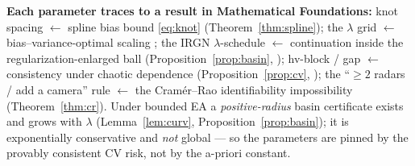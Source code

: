 \medskip
\noindent\textbf{Each parameter traces to a result in Mathematical
Foundations:} knot spacing $\leftarrow$ spline bias bound
\eqref{eq:knot} (Theorem~\ref{thm:spline}); the $\lambda$ grid
$\leftarrow$ bias--variance-optimal scaling \cite{wahba1990,craven1979};
the IRGN $\lambda$-schedule $\leftarrow$ continuation inside the
regularization-enlarged ball (Proposition~\ref{prop:basin},
\cite{bakushinskii1992}); hv-block / gap $\leftarrow$ consistency under
chaotic dependence (Proposition~\ref{prop:cv}, \cite{racine2000}); the
``$\ge 2$ radars / add a camera'' rule $\leftarrow$ the Cramér--Rao
identifiability impossibility (Theorem~\ref{thm:cr}). Under bounded EA a \emph{positive-radius} basin
certificate exists and grows with $\lambda$ (Lemma~\ref{lem:curv},
Proposition~\ref{prop:basin}); it is exponentially conservative and
\emph{not} global --- so the parameters are pinned by the provably
consistent CV risk, not by the a-priori constant.
